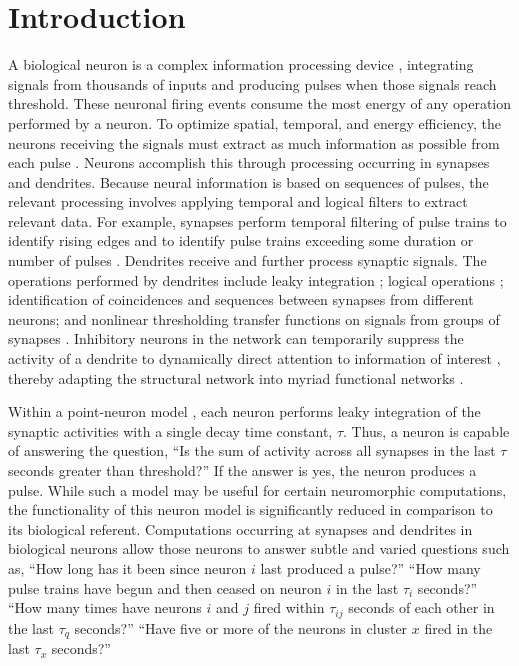 \documentclass[twocolumn]{article}
\begin{document}
\section{\label{sec:introduction}Introduction}
A biological neuron is a complex information processing device \cite{ko1997}, integrating signals from thousands of inputs and producing pulses when those signals reach threshold. These neuronal firing events consume the most energy of any operation performed by a neuron. To optimize spatial, temporal, and energy efficiency, the neurons receiving the signals must extract as much information as possible from each pulse \cite{lase2003}. Neurons accomplish this through processing occurring in synapses and dendrites. Because neural information is based on sequences of pulses, the relevant processing involves applying temporal and logical filters to extract relevant data. For example, synapses perform temporal filtering of pulse trains to identify rising edges and to identify pulse trains exceeding some duration or number of pulses \cite{abre2004}. Dendrites receive and further process synaptic signals. The operations performed by dendrites include leaky integration \cite{geki2002}; logical operations \cite{stsp2015}; identification of coincidences \cite{stsp2015} and sequences \cite{stse2007,haah2015} between synapses from different neurons; and nonlinear thresholding transfer functions on signals from groups of synapses \cite{sava2017}. Inhibitory neurons in the network can temporarily suppress the activity of a dendrite to dynamically direct attention to information of interest \cite{enfr2001}, thereby adapting the structural network into myriad functional networks \cite{brme2010}.

Within a point-neuron model \cite{geki2002}, each neuron performs leaky integration of the synaptic activities with a single decay time constant, $\tau$. Thus, a neuron is capable of answering the question, ``Is the sum of activity across all synapses in the last $\tau$ seconds greater than threshold?'' If the answer is yes, the neuron produces a pulse. While such a model may be useful for certain neuromorphic computations, the functionality of this neuron model is significantly reduced in comparison to its biological referent. Computations occurring at synapses and dendrites in biological neurons allow those neurons to answer subtle and varied questions such as, ``How long has it been since neuron $i$ last produced a pulse?'' ``How many pulse trains have begun and then ceased on neuron $i$ in the last $\tau_i$ seconds?'' ``How many times have neurons $i$ and $j$ fired within $\tau_{ij}$ seconds of each other in the last $\tau_q$ seconds?'' ``Have five or more of the neurons in cluster $x$ fired in the last $\tau_x$ seconds?''
\end{document}
